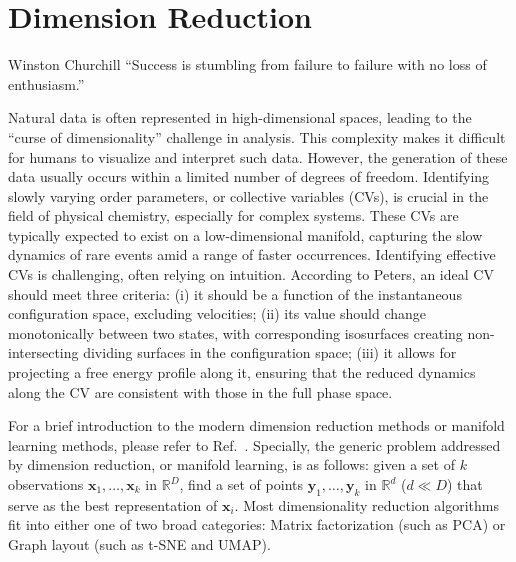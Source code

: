 \chapter{Dimension Reduction\label{chapter:DR}}
\begin{chapquote}{Winston Churchill%
	}
	``Success is stumbling from failure to failure with no loss of enthusiasm.''
\end{chapquote}

Natural data is often represented in high-dimensional spaces, leading to the ``curse of dimensionality'' challenge in analysis. This complexity makes it difficult for humans to visualize and interpret such data. However, the generation of these data usually occurs within a limited number of degrees of freedom. Identifying slowly varying order parameters, or collective variables (CVs), is crucial in the field of physical chemistry, especially for complex systems. These CVs are typically expected to exist on a low-dimensional manifold, capturing the slow dynamics of rare events amid a range of faster occurrences. Identifying effective CVs is challenging, often relying on intuition. According to Peters\cite{PetersARPC2016}, an ideal CV should meet three criteria: (i) it should be a function of the instantaneous configuration space, excluding velocities; (ii) its value should change monotonically between two states, with corresponding isosurfaces creating non-intersecting dividing surfaces in the configuration space; (iii) it allows for projecting a free energy profile along it, ensuring that the reduced dynamics along the CV are consistent with those in the full phase space.

For a brief introduction to the modern dimension reduction methods or manifold learning methods, please refer to Ref.~\cite{IzamanWIREsCS2012}. Specially, the generic problem addressed by dimension reduction, or manifold learning, is as follows: given a set of $k$ observations $\mathbf{x}_1,\dots,\mathbf{x}_k$ in $\mathbb{R}^D$, find a set of points $\mathbf{y}_1,\dots,\mathbf{y}_k$ in $\mathbb{R}^d$ ($d\ll D$) that serve as the best representation of $\mathbf{x}_i$. Most dimensionality reduction algorithms fit into either one of two broad categories: Matrix factorization (such as PCA) or Graph layout (such as t-SNE and UMAP).

